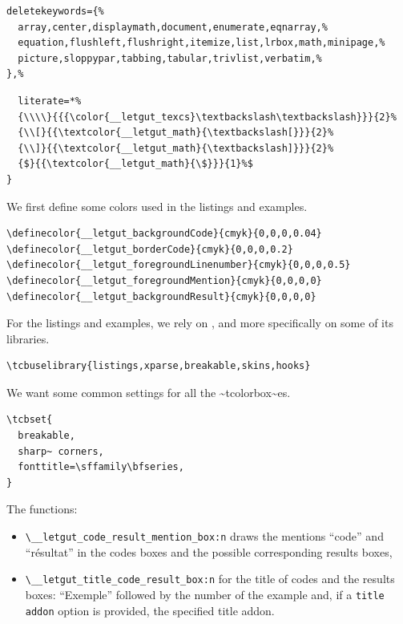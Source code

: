 \documentclass{letgut}
\begin{document}
\begin{lstlisting}
deletekeywords={%
  array,center,displaymath,document,enumerate,eqnarray,%
  equation,flushleft,flushright,itemize,list,lrbox,math,minipage,%
  picture,sloppypar,tabbing,tabular,trivlist,verbatim,%
},%
\end{lstlisting}

\begin{lstlisting}
  literate=*%
  {\\\\}{{{\color{__letgut_texcs}\textbackslash\textbackslash}}}{2}%
  {\\[}{{\textcolor{__letgut_math}{\textbackslash[}}}{2}%
  {\\]}{{\textcolor{__letgut_math}{\textbackslash]}}}{2}%
  {$}{{\textcolor{__letgut_math}{\$}}}{1}%$
}
\end{lstlisting}

We first define some colors used in the listings and examples.

\begin{lstlisting}
\definecolor{__letgut_backgroundCode}{cmyk}{0,0,0,0.04}
\definecolor{__letgut_borderCode}{cmyk}{0,0,0,0.2}
\definecolor{__letgut_foregroundLinenumber}{cmyk}{0,0,0,0.5}
\definecolor{__letgut_foregroundMention}{cmyk}{0,0,0,0}
\definecolor{__letgut_backgroundResult}{cmyk}{0,0,0,0}
\end{lstlisting}

For the listings and examples, we rely on , and more
specifically on some of its libraries.

\begin{lstlisting}
\tcbuselibrary{listings,xparse,breakable,skins,hooks}
\end{lstlisting}

We want some common settings for all the \textasciitilde{}tcolorbox\textasciitilde{}es.

\begin{lstlisting}
\tcbset{
  breakable,
  sharp~ corners,
  fonttitle=\sffamily\bfseries,
}
\end{lstlisting}

The functions:

\begin{itemize}
\item \lstinline+\__letgut_code_result_mention_box:n+ draws the mentions “code” and “résultat”
in the codes boxes and the possible corresponding results boxes,
\item \lstinline+\__letgut_title_code_result_box:n+ for the title of codes and the results
boxes: “Exemple” followed by the number of the example and, if a \lstinline+title addon+
option is provided, the specified title addon.
\end{itemize}
\end{document}

